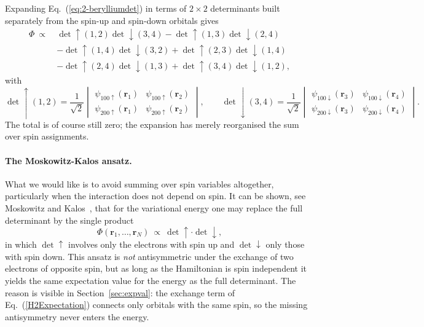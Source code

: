 Expanding Eq.~(\ref{eq:2-berylliumdet}) in terms of $2\times2$ determinants
built separately from the spin-up and spin-down orbitals gives
\begin{align}
  \Phi \ \propto\
  &\det\!\uparrow(1,2)\det\!\downarrow(3,4)
  -\det\!\uparrow(1,3)\det\!\downarrow(2,4) \nonumber\\
  &-\det\!\uparrow(1,4)\det\!\downarrow(3,2)
  +\det\!\uparrow(2,3)\det\!\downarrow(1,4) \nonumber\\
  &-\det\!\uparrow(2,4)\det\!\downarrow(1,3)
  +\det\!\uparrow(3,4)\det\!\downarrow(1,2) ,
  \label{eq:2-spinexpansion}
\end{align}
with
\begin{equation}
  \det\!\uparrow(1,2)=\frac{1}{\sqrt{2}}
  \begin{vmatrix}
    \psi_{100\uparrow}(\bm{r}_1) & \psi_{100\uparrow}(\bm{r}_2)\\
    \psi_{200\uparrow}(\bm{r}_1) & \psi_{200\uparrow}(\bm{r}_2)
  \end{vmatrix},
  \qquad
  \det\!\downarrow(3,4)=\frac{1}{\sqrt{2}}
  \begin{vmatrix}
    \psi_{100\downarrow}(\bm{r}_3) & \psi_{100\downarrow}(\bm{r}_4)\\
    \psi_{200\downarrow}(\bm{r}_3) & \psi_{200\downarrow}(\bm{r}_4)
  \end{vmatrix}.
  \label{eq:2-updowndets}
\end{equation}
The total is of course still zero; the expansion has merely reorganised the
sum over spin assignments.

\paragraph{The Moskowitz-Kalos ansatz.}
What we would like is to avoid summing over spin variables altogether,
particularly when the interaction does not depend on spin.  It can be shown,
see Moskowitz and Kalos~\cite{moskowitz1981}, that for the variational energy
one may replace the full determinant by the single product
\begin{equation}
  \Phi(\bm{r}_1,\dots,\bm{r}_N)\ \propto\
  \det\!\uparrow\cdot\det\!\downarrow ,
  \label{eq:2-spinfactorised}
\end{equation}
in which $\det\!\uparrow$ involves only the electrons with spin up and
$\det\!\downarrow$ only those with spin down.  This ansatz is \emph{not}
antisymmetric under the exchange of two electrons of opposite spin, but as
long as the Hamiltonian is spin independent it yields the same expectation
value for the energy as the full determinant.  The reason is visible in
Section~\ref{sec:expval}: the exchange term of Eq.~(\ref{H2Expectation})
connects only orbitals with the same spin, so the missing antisymmetry never
enters the energy.

